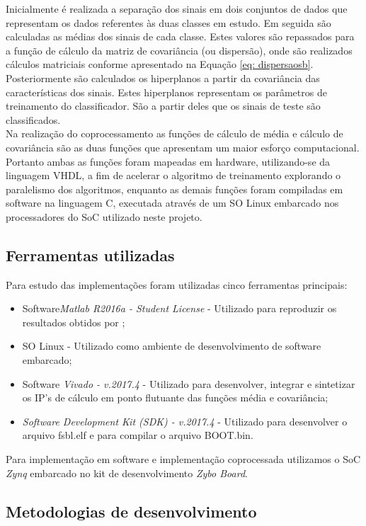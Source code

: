 Inicialmente é realizada a separação dos sinais em dois conjuntos de dados que representam os dados referentes às duas classes em estudo. Em seguida são calculadas as médias dos sinais de cada classe. Estes valores são repassados para a função de cálculo da matriz de covariância (ou dispersão), onde são realizados cálculos matriciais conforme apresentado na Equação \ref{eq: dispersaosb}. Posteriormente são calculados os hiperplanos a partir da covariância das características dos sinais. Estes hiperplanos representam os parâmetros de treinamento do classificador. São a partir deles que os sinais de teste são classificados.\\

Na realização do coprocessamento as funções de cálculo de média e cálculo de covariância são as duas funções que apresentam um maior esforço computacional. Portanto ambas as funções foram mapeadas em hardware, utilizando-se da linguagem VHDL, a fim de acelerar o algoritmo de treinamento explorando o paralelismo dos algoritmos, enquanto as demais funções foram compiladas em software na linguagem C, executada através de um SO Linux embarcado nos processadores do SoC utilizado neste projeto.

\subsection{Ferramentas utilizadas}
Para estudo das implementações foram utilizadas cinco ferramentas principais:\\
\begin{itemize}
	\item Software\textit{Matlab R2016a - \textit{Student License}} - Utilizado para reproduzir os resultados obtidos por \cite{F.Lotte};
	\item SO Linux - Utilizado como ambiente de desenvolvimento de software embarcado;
	\item Software \textit{Vivado - v.2017.4} - Utilizado para desenvolver, integrar e sintetizar os IP's de cálculo em ponto flutuante das funções média e covariância;
	\item \textit{Software Development Kit (SDK) - v.2017.4} - Utilizado para desenvolver o arquivo fsbl.elf e para compilar o arquivo BOOT.bin.
\end{itemize}

Para implementação em software e implementação coprocessada utilizamos o SoC \textit{Zynq} embarcado no kit de desenvolvimento \textit{Zybo Board}.

\subsection{Metodologias de desenvolvimento}
